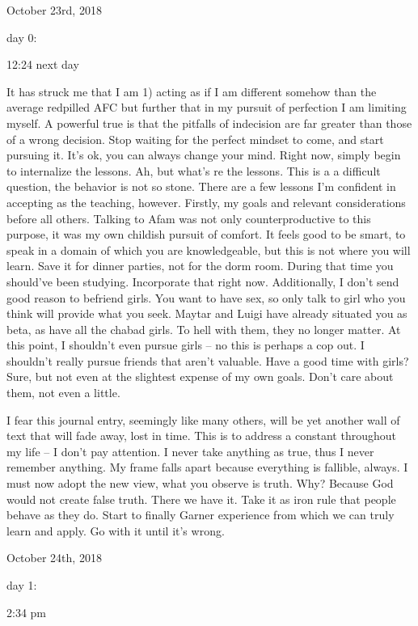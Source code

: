 \bigskip
\bigskip
October 23rd, 2018

day 0:

12:24 next day

It has struck me that I am 1) acting as if I am different somehow than
the average redpilled AFC but further that in my pursuit of perfection I
am limiting myself. A powerful true is that the pitfalls of indecision
are far greater than those of a wrong decision. Stop waiting for the
perfect mindset to come, and start pursuing it. It's ok, you can always
change your mind. Right now, simply begin to internalize the lessons.
Ah, but what's re the lessons. This is a a difficult question, the
behavior is not so stone. There are a few lessons I'm confident in
accepting as the teaching, however. Firstly, my goals and relevant
considerations before all others. Talking to Afam was not only
counterproductive to this purpose, it was my own childish pursuit of
comfort. It feels good to be smart, to speak in a domain of which you
are knowledgeable, but this is not where you will learn. Save it for
dinner parties, not for the dorm room. During that time you should've
been studying. Incorporate that right now. Additionally, I don't send
good reason to befriend girls. You want to have sex, so only talk to
girl who you think will provide what you seek. Maytar and Luigi have
already situated you as beta, as have all the chabad girls. To hell with
them, they no longer matter. At this point, I shouldn't even pursue
girls -- no this is perhaps a cop out. I shouldn't really pursue friends
that aren't valuable. Have a good time with girls? Sure, but not even at
the slightest expense of my own goals. Don't care about them, not even a
little.

I fear this journal entry, seemingly like many others, will be yet
another wall of text that will fade away, lost in time. This is to
address a constant throughout my life -- I don't pay attention. I never
take anything as true, thus I never remember anything. My frame falls
apart because everything is fallible, always. I must now adopt the new
view, what you observe is truth. Why? Because God would not create false
truth. There we have it. Take it as iron rule that people behave as they
do. Start to finally Garner experience from which we can truly learn and
apply. Go with it until it's wrong.

\bigskip
\bigskip
October 24th, 2018

day 1:

2:34 pm

